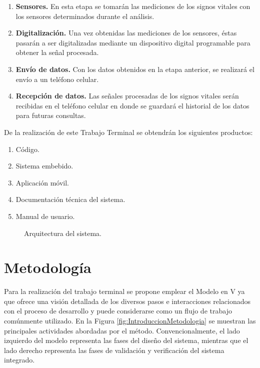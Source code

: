 \begin{enumerate}
	\item \textbf{Sensores.} En esta etapa se tomarán las mediciones de los signos vitales  con los sensores determinados durante el análisis.
	\item \textbf{Digitalización.} Una vez obtenidas las mediciones de los sensores, éstas pasarán a ser digitalizadas mediante un dispositivo digital programable para obtener la señal procesada.
	\item \textbf{Envío de datos.} Con los datos obtenidos en la etapa anterior, se realizará el envío a un teléfono celular.
	\item \textbf{Recepción de datos.}  Las señales procesadas de los signos vitales serán recibidas en el teléfono celular en donde se guardará el historial de los datos para futuras consultas.
\end{enumerate}

De la realización de este Trabajo Terminal se obtendrán los siguientes productos:

\begin{enumerate}
	\item Código.
	\item Sistema embebido.
	\item Aplicación móvil.
	\item Documentación técnica del sistema.
	\item Manual de usuario.
\end{enumerate}

\begin{figure}[htbp!]
	\centering
	\caption{Arquitectura del sistema.}
	\label{fig:IntroduccionArqui}
\end{figure}

\section{Metodología}
Para la realización del trabajo terminal se propone emplear el Modelo en V ya que ofrece una visión detallada de los diversos pasos e interacciones relacionados con el proceso de desarrollo y puede considerarse como un flujo de trabajo comúnmente utilizado. En la Figura \ref{fig:IntroduccionMetodologia} se muestran las principales actividades abordadas por el método. Convencionalmente, el lado izquierdo del modelo representa las fases del diseño del sistema, mientras que el lado derecho representa las fases de validación y verificación del sistema integrado.

